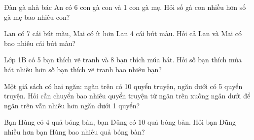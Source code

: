 \begin{ex}
Đàn gà nhà bác An có 6 con gà con và 1 con gà mẹ. Hỏi số gà con nhiều hơn số gà mẹ bao nhiêu con?
\end{ex}

\begin{ex}
Lan có 7 cái bút màu, Mai có ít hơn Lan 4 cái bút màu. Hỏi cả Lan và Mai có bao nhiêu cái bút màu?
\end{ex}

\begin{ex}
Lớp 1B có 5 bạn thích vẽ tranh và 8 bạn thích múa hát. Hỏi số bạn thích múa hát nhiều hơn số bạn thích vẽ tranh bao nhiêu bạn?
\end{ex}

\begin{ex}
Một giá sách có hai ngăn: ngăn trên có 10 quyển truyện, ngăn dưới có 5 quyển truyện. Hỏi cần chuyển bao nhiêu quyển truyện từ ngăn trên xuống ngăn dưới để ngăn trên vẫn nhiều hơn ngăn dưới 1 quyển?
\end{ex}

\begin{ex}
Bạn Hùng có 4 quả bóng bàn, bạn Dũng có 10 quả bóng bàn. Hỏi bạn Dũng nhiều hơn bạn Hùng bao nhiêu quả bóng bàn?
\end{ex}
